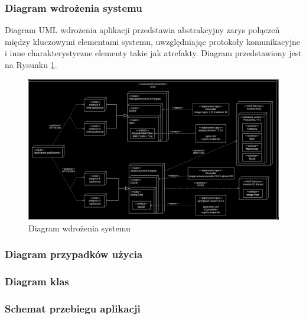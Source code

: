 \documentclass[../main.tex]{subfiles}
\begin{document}
        \subsubsection*{Diagram wdrożenia systemu}
        Diagram UML wdrożenia aplikacji przedstawia abstrakcyjny zarys połączeń między kluczowymi elementami systemu, uwzględniając protokoły komunikacyjne i inne charakterystyczne elementy takie jak atrefakty. Diagram przedstawiony jest na Rysunku \ref{fig:deployment-diagram}.
        \begin{figure}[!ht]
            \centering
            \includegraphics[width=1.0\linewidth]{images/deployment-diagram.png}
            \caption{Diagram wdrożenia systemu}
            \label{fig:deployment-diagram}
        \end{figure}

        \subsubsection*{Diagram przypadków użycia}
        \subsubsection*{Diagram klas}
        \subsubsection*{Schemat przebiegu aplikacji}
\end{document}
